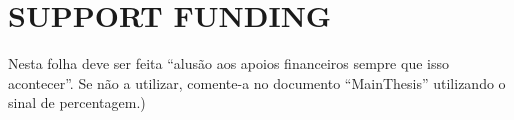 \chapter{SUPPORT FUNDING}

Nesta folha deve ser feita ``alusão aos apoios financeiros sempre que isso acontecer''. Se não a utilizar, comente-a no documento ``MainThesis'' utilizando o sinal de percentagem.)
